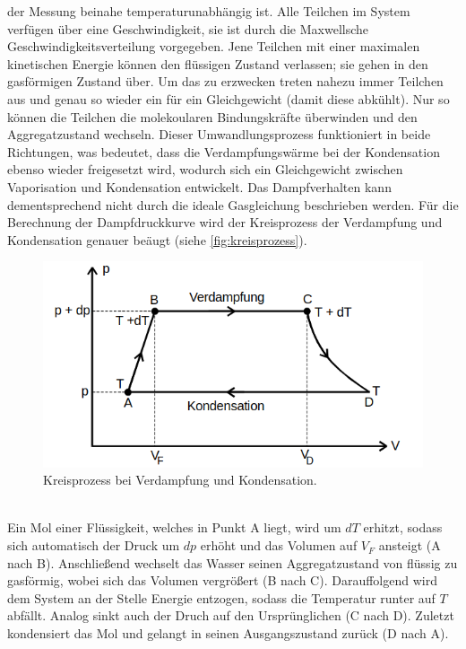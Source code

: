 der Messung beinahe temperaturunabhängig ist.
Alle Teilchen im System verfügen über eine Geschwindigkeit, sie ist durch die 
Maxwellsche Geschwindigkeitsverteilung vorgegeben. Jene Teilchen mit einer 
maximalen kinetischen Energie können den flüssigen Zustand verlassen; sie gehen 
in den gasförmigen Zustand über. Um das zu erzwecken treten nahezu immer Teilchen 
aus und genau so wieder ein für ein Gleichgewicht (damit diese abkühlt). Nur 
so können die Teilchen die molekoularen Bindungskräfte überwinden und den 
Aggregatzustand wechseln. Dieser Umwandlungsprozess funktioniert in beide 
Richtungen, was bedeutet, dass die Verdampfungswärme bei der Kondensation ebenso
wieder freigesetzt wird, wodurch sich ein Gleichgewicht zwischen Vaporisation und
Kondensation entwickelt. Das Dampfverhalten 
kann dementsprechend nicht durch die ideale Gasgleichung beschrieben werden.
Für die Berechnung der Dampfdruckkurve wird der Kreisprozess der Verdampfung 
und Kondensation genauer beäugt (siehe \autoref{fig:kreisprozess}).
\begin{figure}[h]
    \centering
        \centering
        \includegraphics[width=\textwidth]{Bilder/kreisprozess.png}
        \caption{Kreisprozess bei Verdampfung und Kondensation. \cite{kreisprozess}}
    \hfill
    \label{fig:kreisprozess}
\end{figure}
\\
Ein Mol einer Flüssigkeit, welches in Punkt A liegt, wird um $dT$ erhitzt, 
sodass sich automatisch der Druck um $dp$ erhöht und das Volumen auf $V_F$ 
ansteigt (A nach B). Anschließend wechselt das Wasser seinen Aggregatzustand
von flüssig zu gasförmig, wobei sich das Volumen vergrößert (B nach C).
Darauffolgend wird dem System an der Stelle Energie entzogen, sodass die Temperatur
runter auf $T$ abfällt.
Analog sinkt auch der Druch auf den Ursprünglichen (C nach D). Zuletzt 
kondensiert das Mol und gelangt in seinen Ausgangszustand zurück (D nach A).
